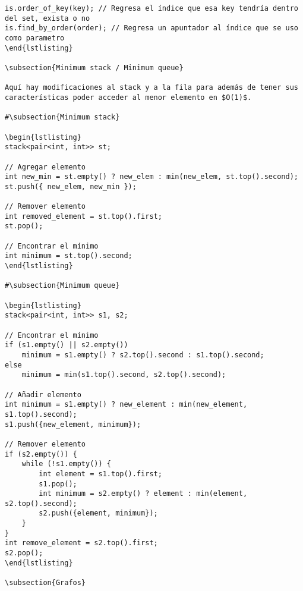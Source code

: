 \documentclass[11pt]{article}
\begin{document}
\begin{verbatim}
is.order_of_key(key); // Regresa el índice que esa key tendría dentro del set, exista o no
is.find_by_order(order); // Regresa un apuntador al índice que se uso como parametro
\end{lstlisting}

\subsection{Minimum stack / Minimum queue}

Aquí hay modificaciones al stack y a la fila para además de tener sus
características poder acceder al menor elemento en $O(1)$.

#\subsection{Minimum stack}

\begin{lstlisting}
stack<pair<int, int>> st;

// Agregar elemento
int new_min = st.empty() ? new_elem : min(new_elem, st.top().second);
st.push({ new_elem, new_min });

// Remover elemento
int removed_element = st.top().first;
st.pop();

// Encontrar el mínimo
int minimum = st.top().second;
\end{lstlisting}

#\subsection{Minimum queue}

\begin{lstlisting}
stack<pair<int, int>> s1, s2;

// Encontrar el mínimo
if (s1.empty() || s2.empty()) 
    minimum = s1.empty() ? s2.top().second : s1.top().second;
else
    minimum = min(s1.top().second, s2.top().second);

// Añadir elemento
int minimum = s1.empty() ? new_element : min(new_element, s1.top().second);
s1.push({new_element, minimum});

// Remover elemento
if (s2.empty()) {
    while (!s1.empty()) {
        int element = s1.top().first;
        s1.pop();
        int minimum = s2.empty() ? element : min(element, s2.top().second);
        s2.push({element, minimum});
    }
}
int remove_element = s2.top().first;
s2.pop();
\end{lstlisting}

\subsection{Grafos}


\end{verbatim}
\end{document}
